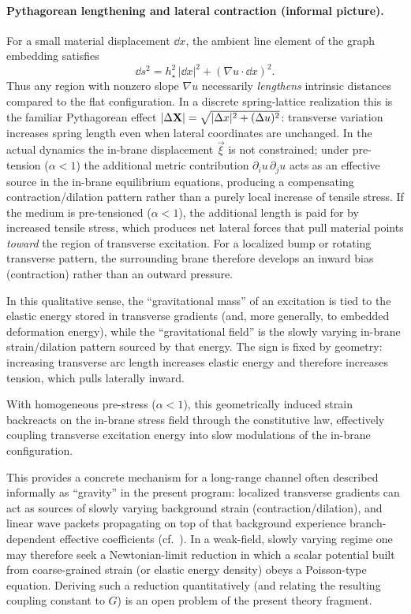 \paragraph{Pythagorean lengthening and lateral contraction (informal picture).}
For a small material displacement $\dd x$, the ambient line element of the graph embedding satisfies
\begin{equation}
  \dd s^2 = h_\star^2\,|\dd x|^2 + (\nabla u\cdot \dd x)^2.
  \label{eq:line-element-graph}
\end{equation}
Thus any region with nonzero slope $\nabla u$ necessarily \emph{lengthens} intrinsic distances compared to the flat
configuration.
In a discrete spring-lattice realization this is the familiar Pythagorean effect
$|\Delta \mathbf{X}|=\sqrt{|\Delta x|^2+(\Delta u)^2}$: transverse variation increases spring length even when lateral
coordinates are unchanged.
In the actual dynamics the in-brane displacement $\vec\xi$ is not constrained; under pre-tension ($\alpha<1$) the
additional metric contribution $\partial_i u\,\partial_j u$ acts as an effective source in the in-brane equilibrium
equations, producing a compensating contraction/dilation pattern rather than a purely local increase of tensile stress.
If the medium is pre-tensioned ($\alpha<1$), the additional length is paid for by increased tensile stress,
which produces net lateral forces that pull material points \emph{toward} the region of transverse excitation.
For a localized bump or rotating transverse pattern, the surrounding brane therefore develops an inward bias
(contraction) rather than an outward pressure.

In this qualitative sense, the ``gravitational mass'' of an excitation is tied to the elastic energy stored in
transverse gradients (and, more generally, to embedded deformation energy), while the ``gravitational field'' is the
slowly varying in-brane strain/dilation pattern sourced by that energy.
The sign is fixed by geometry: increasing transverse arc length increases elastic energy and therefore increases
tension, which pulls laterally inward.

With homogeneous pre-stress ($\alpha<1$), this geometrically induced strain backreacts on the in-brane stress field
through the constitutive law, effectively coupling transverse excitation energy into slow modulations of the
in-brane configuration.

This provides a concrete mechanism for a long-range channel often described informally as ``gravity'' in the present
program: localized transverse gradients can act as sources of slowly varying background strain (contraction/dilation),
and linear wave packets propagating on top of that background experience branch-dependent effective coefficients
(cf.\ ).
In a weak-field, slowly varying regime one may therefore seek a Newtonian-limit reduction in which a scalar potential
built from coarse-grained strain (or elastic energy density) obeys a Poisson-type equation.
Deriving such a reduction quantitatively (and relating the resulting coupling constant to $G$) is an open problem of
the present theory fragment.
